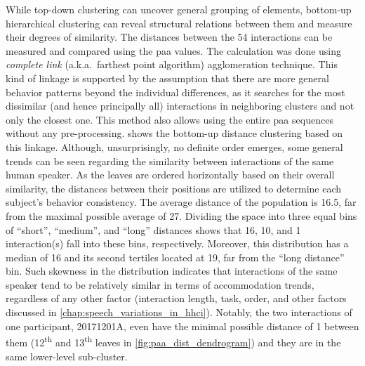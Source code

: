 While top-down clustering can uncover general grouping of elements, bottom-up hierarchical clustering can reveal structural relations between them and measure their degrees of similarity.
The distances between the 54 interactions can be measured and compared using the \ac{paa} values.
The calculation was done using \emph{complete link} (a.k.a.\ farthest point algorithm) agglomeration technique.
This kind of linkage is supported by the assumption that there are more general behavior patterns beyond the individual differences, as it searches for the most dissimilar (and hence principally all) interactions in neighboring clusters and not only the closest one.
This method also allows using the entire \ac{paa} sequences without any pre-processing.
 shows the bottom-up distance clustering based on this linkage. 
Although, unsurprisingly, no definite order emerges, some general trends can be seen regarding the similarity between interactions of the same human speaker.
As the leaves are ordered horizontally based on their overall similarity, the distances between their positions are utilized to determine each subject's behavior consistency.
The average distance of the population is 16.5, far from the maximal possible average of 27.
Dividing the space into three equal bins of \enquote{short}, \enquote{medium}, and \enquote{long} distances shows that 16, 10, and 1 interaction(s) fall into these bins, respectively.
Moreover, this distribution has a median of 16 and its second tertiles located at 19, far from the \enquote{long distance} bin.
Such skewness in the distribution indicates that interactions of the same speaker tend to be relatively similar in terms of accommodation trends, regardless of any other factor (interaction length, task, order, and other factors discussed in \cref{chap:speech_variations_in_hhci}).
Notably, the two interactions of one participant, 20171201A, even have the minimal possible distance of 1 between them (12\textsuperscript{th} and 13\textsuperscript{th} leaves in \cref{fig:paa_dist_dendrogram}) and they are in the same lower-level sub-cluster.

